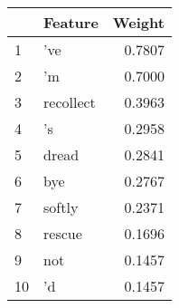 \begin{tabular}{llr}
\toprule
{} &    Feature &  Weight \\
\midrule
1  &        've &  0.7807 \\
2  &         'm &  0.7000 \\
3  &  recollect &  0.3963 \\
4  &         's &  0.2958 \\
5  &      dread &  0.2841 \\
6  &        bye &  0.2767 \\
7  &     softly &  0.2371 \\
8  &     rescue &  0.1696 \\
9  &        not &  0.1457 \\
10 &         'd &  0.1457 \\
\bottomrule
\end{tabular}
